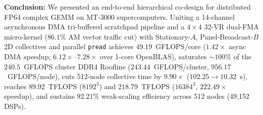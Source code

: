 \documentclass[journal]{IEEEtran}
\begin{document}
\textbf{Conclusion:} We presented an end-to-end hierarchical co-design for distributed FP64 complex GEMM on MT-3000 supercomputers. Uniting a 14-channel asynchronous DMA tri-buffered scratchpad pipeline and a $4 \times 4$ 32-VR dual-FMA micro-kernel ($86.1\%$ AM vector traffic cut) with Stationary-$A$, Panel-Broadcast-$B$ 2D collectives and parallel \texttt{pread} achieves $49.19$~GFLOPS/core ($1.42\times$ async DMA speedup; $6.12\times$--$7.28\times$ over 1-core OpenBLAS), saturates $\sim\!100\%$ of the $240.5$~GFLOPS cluster DDR4 Roofline ($243.44$~GFLOPS/cluster, $956.17$~GFLOPS/node), cuts 512-node collective time by $9.90\times$ ($102.25 \to 10.32$~s), reaches $89.92$~TFLOPS ($8192^3$) and $218.79$~TFLOPS ($16384^3$, $222.49\times$ speedup), and sustains $92.21\%$ weak-scaling efficiency across 512 nodes (49,152 DSPs).



\end{document}
